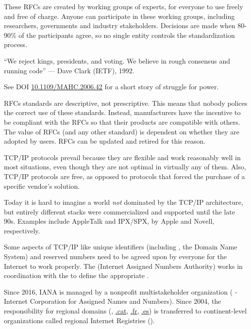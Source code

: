 These RFCs are created by working groups of experts, 
for everyone to use freely and free of charge. 
% 
Anyone can participate in these working groups, including researchers,
governments and industry stakeholders. 
% 
Decisions are made when 80-90\% of the participants agree, so no single 
entity controls the standardization process.
% 
\begin{remark}
``We reject kings, presidents, and voting. 
We believe in rough consensus and running code'' 
--- Dave Clark (IETF), 1992.

See DOI \href{https://dx.doi.org/10.1109/MAHC.2006.42}{\underline{10.1109/MAHC.2006.42}} for 
a short story of struggle for power.
\end{remark}

RFCs standards are descriptive, not prescriptive. This means that nobody polices the correct 
use of these standards. Instead, manufacturers have the incentive to be compliant with the RFCs 
so that their products are compatible with others. 
% 
The value of RFCs (and any other standard) is dependent on whether
they are adopted by users. RFCs can be updated and retired for this reason.

TCP/IP protocols prevail because they are flexible and work reasonably well in most situations, 
even though they are not optimal in virtually any of them. 
Also, TCP/IP protocols are free, as opposed to  protocols
that forced the purchase of a specific vendor's solution.
% 
\begin{remark}
Today it is hard to imagine a world \textit{not} 
dominated by the TCP/IP architecture, 
but entirely different stacks were commercialized and supported until the late 90s.
Examples include AppleTalk and IPX/SPX, by Apple and Novell, respectively.
\end{remark}


Some aspects of TCP/IP like unique identifiers 
(including , the Domain Name System)
and reserved numbers need to be agreed upon by everyone for the Internet to work properly.
% 
The  (Internet Assigned Numbers Authority) works in coordination with the 
to define the appropriate .

\begin{remark}
Since 2016, IANA is managed by a nonprofit multistakeholder organization 
( - Internet Corporation for Assigned Names and Numbers).
% 
Since 2004, the responsibility for regional domains 
(\eg, \url{.cat}, \url{.fr}, \url{.es}) is transferred to continent-level 
organizations called regional Internet Registries ().
\end{remark}



